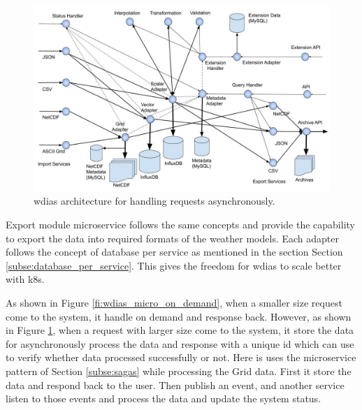 \begin{figure}[htp]
    \centering
    \includegraphics[width=1\textwidth]{method/microservice/microservice_architecture-handle_on_async-v3.jpg}
    \caption{\acrshort{wdias} architecture for handling requests asynchronously.}
    \label{fi:wdias_micro_async}
\end{figure}
Export module microservice follows the same concepts and provide the capability to export the data into required formats of the weather models.
Each adapter follows the concept of database per service as mentioned in the section Section \ref{subse:database_per_service}. This gives the freedom for \acrshort{wdias} to scale better with \acrshort{k8s}.

As shown in Figure \ref{fi:wdias_micro_on_demand}, when a smaller size request come to the system, it handle on demand and response back. However, as shown in Figure \ref{fi:wdias_micro_async}, when a request with larger size come to the system, it store the data for asynchronously process the data and response with a unique id which can use to verify whether data processed successfully or not. Here is uses the microservice pattern of Section \ref{subse:sagas} while processing the Grid data. First it store the data and respond back to the user. Then publish an event, and another service listen to those events and process the data and update the system status.


